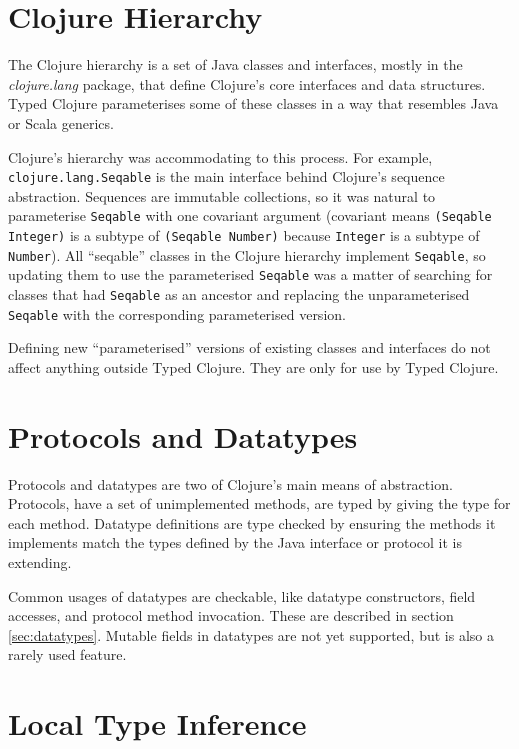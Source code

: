\section{Clojure Hierarchy}

The Clojure hierarchy is a set of Java classes and interfaces, mostly in the
\emph{clojure.lang} package, that define Clojure's core 
interfaces and data structures.
Typed Clojure parameterises some of these classes in a way that resembles
Java or Scala generics.

Clojure's hierarchy was accommodating to this process.
For example, \lstinline{clojure.lang.Seqable} is the main interface behind
Clojure's sequence abstraction. Sequences are immutable collections,
so it was natural to parameterise \lstinline{Seqable} with one covariant
argument (covariant means \lstinline|(Seqable Integer)| is
a subtype of \lstinline|(Seqable Number)| because \lstinline|Integer|
is a subtype of \lstinline|Number|).
All ``seqable'' classes in the Clojure hierarchy implement \lstinline|Seqable|,
so updating them to use the parameterised \lstinline|Seqable| was a matter of
searching for classes that had \lstinline|Seqable| as an ancestor and replacing
the unparameterised \lstinline|Seqable| with the corresponding parameterised 
version.

Defining new ``parameterised'' versions of existing classes and interfaces do 
not affect anything outside Typed Clojure.
They are only for use by Typed Clojure.

\section{Protocols and Datatypes}

Protocols and datatypes are two of Clojure's main means of abstraction.
Protocols, have a set of unimplemented methods, are typed by
giving the type for each method.
Datatype definitions are type checked by ensuring the methods it
implements match the types defined by the Java interface or protocol
it is extending.

Common usages of datatypes are checkable, like datatype
constructors, field accesses, and protocol method invocation.
These are described in section \ref{sec:datatypes}.
Mutable fields in datatypes are not yet supported, but is
also a rarely used feature.

\section{Local Type Inference}

